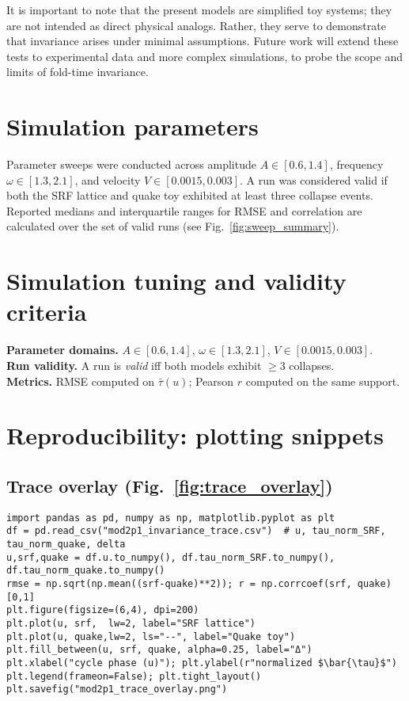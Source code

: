 \documentclass[12pt]{article}
\begin{document}
It is important to note that the present models are simplified toy systems;
they are not intended as direct physical analogs. Rather, they serve to demonstrate
that invariance arises under minimal assumptions. Future work will extend these
tests to experimental data and more complex simulations, to probe the scope and
limits of fold-time invariance.
\appendix
\section{Simulation parameters}
Parameter sweeps were conducted across amplitude $A \in [0.6, 1.4]$, frequency
$\omega \in [1.3, 2.1]$, and velocity $V \in [0.0015, 0.003]$. A run was considered
valid if both the SRF lattice and quake toy exhibited at least three collapse
events. Reported medians and interquartile ranges for RMSE and correlation are
calculated over the set of valid runs (see Fig.~\ref{fig:sweep_summary}).
\section{Simulation tuning and validity criteria}
\noindent\textbf{Parameter domains.} $A\in[0.6,1.4]$, $\omega\in[1.3,2.1]$, $V\in[0.0015,0.003]$.\\
\noindent\textbf{Run validity.} A run is \emph{valid} iff both models exhibit $\geq 3$ collapses.\\
\noindent\textbf{Metrics.} RMSE computed on $\bar{\tau}(u)$; Pearson $r$ computed on the same support.

\section{Reproducibility: plotting snippets}

\subsection{Trace overlay (Fig.~\ref{fig:trace_overlay})}
\begin{lstlisting}
import pandas as pd, numpy as np, matplotlib.pyplot as plt
df = pd.read_csv("mod2p1_invariance_trace.csv")  # u, tau_norm_SRF, tau_norm_quake, delta
u,srf,quake = df.u.to_numpy(), df.tau_norm_SRF.to_numpy(), df.tau_norm_quake.to_numpy()
rmse = np.sqrt(np.mean((srf-quake)**2)); r = np.corrcoef(srf, quake)[0,1]
plt.figure(figsize=(6,4), dpi=200)
plt.plot(u, srf,  lw=2, label="SRF lattice")
plt.plot(u, quake,lw=2, ls="--", label="Quake toy")
plt.fill_between(u, srf, quake, alpha=0.25, label="Δ")
plt.xlabel("cycle phase (u)"); plt.ylabel(r"normalized $\bar{\tau}$")
plt.legend(frameon=False); plt.tight_layout()
plt.savefig("mod2p1_trace_overlay.png")
\end{lstlisting}
\end{document}

